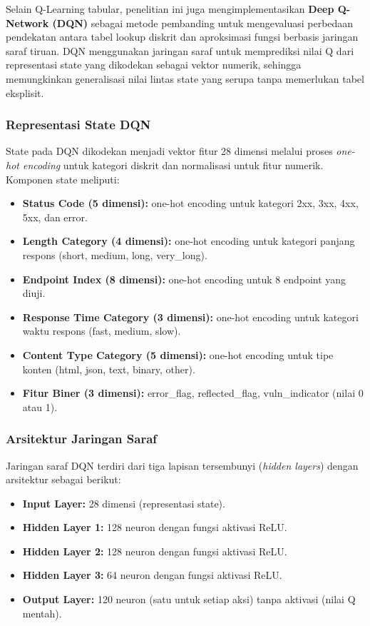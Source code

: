 Selain Q-Learning tabular, penelitian ini juga mengimplementasikan \textbf{Deep Q-Network (DQN)} sebagai metode pembanding untuk mengevaluasi perbedaan pendekatan antara tabel lookup diskrit dan aproksimasi fungsi berbasis jaringan saraf tiruan. DQN menggunakan jaringan saraf untuk memprediksi nilai Q dari representasi state yang dikodekan sebagai vektor numerik, sehingga memungkinkan generalisasi nilai lintas state yang serupa tanpa memerlukan tabel eksplisit.

\subsubsection{Representasi State DQN}

State pada DQN dikodekan menjadi vektor fitur 28 dimensi melalui proses \textit{one-hot encoding} untuk kategori diskrit dan normalisasi untuk fitur numerik. Komponen state meliputi:
\begin{itemize}
    \item \textbf{Status Code (5 dimensi):} one-hot encoding untuk kategori 2xx, 3xx, 4xx, 5xx, dan error.
    \item \textbf{Length Category (4 dimensi):} one-hot encoding untuk kategori panjang respons (short, medium, long, very\_long).
    \item \textbf{Endpoint Index (8 dimensi):} one-hot encoding untuk 8 endpoint yang diuji.
    \item \textbf{Response Time Category (3 dimensi):} one-hot encoding untuk kategori waktu respons (fast, medium, slow).
    \item \textbf{Content Type Category (5 dimensi):} one-hot encoding untuk tipe konten (html, json, text, binary, other).
    \item \textbf{Fitur Biner (3 dimensi):} error\_flag, reflected\_flag, vuln\_indicator (nilai 0 atau 1).
\end{itemize}

\subsubsection{Arsitektur Jaringan Saraf}

Jaringan saraf DQN terdiri dari tiga lapisan tersembunyi (\textit{hidden layers}) dengan arsitektur sebagai berikut:
\begin{itemize}
    \item \textbf{Input Layer:} 28 dimensi (representasi state).
    \item \textbf{Hidden Layer 1:} 128 neuron dengan fungsi aktivasi ReLU.
    \item \textbf{Hidden Layer 2:} 128 neuron dengan fungsi aktivasi ReLU.
    \item \textbf{Hidden Layer 3:} 64 neuron dengan fungsi aktivasi ReLU.
    \item \textbf{Output Layer:} 120 neuron (satu untuk setiap aksi) tanpa aktivasi (nilai Q mentah).
\end{itemize}

